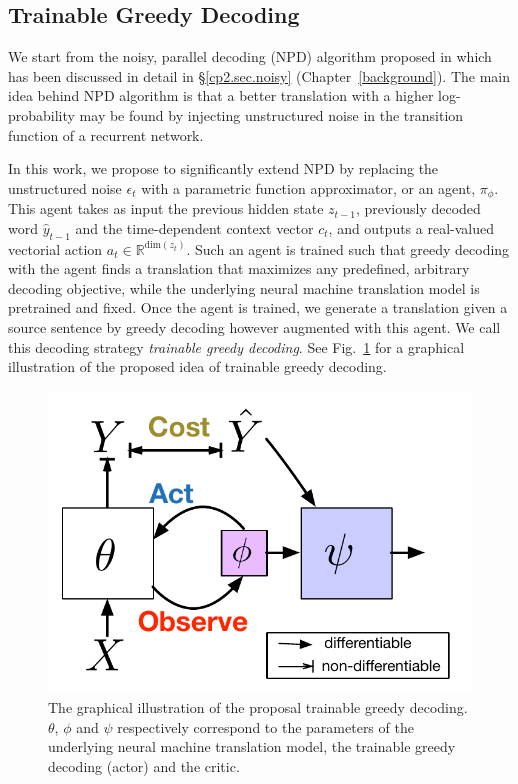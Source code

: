 \subsection{Trainable Greedy Decoding}

We start from the noisy, parallel decoding (NPD) algorithm proposed in \citep{cho2016noisy} which has been discussed in detail in \S\ref{cp2.sec.noisy} (Chapter~\ref{background}). The main idea behind NPD algorithm is that a better translation with a higher log-probability may be found by injecting unstructured noise in the transition function of a recurrent network.

In this work, we propose to significantly extend NPD by replacing the unstructured noise $\epsilon_t$ with a parametric function approximator, or an agent, $\pi_{\phi}$. This agent takes as input the previous hidden state $z_{t-1}$, previously decoded word $\hat{y}_{t-1}$ and the time-dependent context vector $c_t$, and outputs a real-valued vectorial action $a_t \in \mathbb{R}^{\text{dim}(z_t)}$. Such an agent is trained such that greedy decoding with the agent finds a translation that maximizes any predefined, arbitrary decoding objective, while the underlying neural machine translation model is pretrained and fixed. Once the agent is trained, we generate a translation given a source sentence by greedy decoding however augmented with this agent. We call this decoding strategy {\it trainable greedy decoding}. See Fig.~\ref{cp7.fig.framework0} for a graphical illustration of the proposed idea of trainable greedy decoding.
 \begin{figure}[t]
 \centering
 \includegraphics[width=0.66\linewidth]{figs/trainable/Concept.pdf}
 \caption{\label{cp7.fig.framework0} The graphical illustration of the proposal trainable greedy decoding. $\theta$, $\phi$ and $\psi$ respectively correspond to the parameters of the underlying neural machine translation model, the trainable greedy decoding (actor) and the critic. 
 }
 \end{figure}

